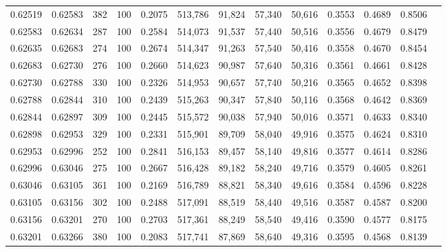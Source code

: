 \begin{tabular}{rrrrrrrrrrrrr}
0.62519 & 0.62583 &   382 & 100 &                                     0.2075 & 513,786 &  91,824 &  57,340 &  50,616 & 0.3553 & 0.4689 & 0.8506 \\
0.62583 & 0.62634 &   287 & 100 &                                     0.2584 & 514,073 &  91,537 &  57,440 &  50,516 & 0.3556 & 0.4679 & 0.8479 \\
0.62635 & 0.62683 &   274 & 100 &                                     0.2674 & 514,347 &  91,263 &  57,540 &  50,416 & 0.3558 & 0.4670 & 0.8454 \\
0.62683 & 0.62730 &   276 & 100 &                                     0.2660 & 514,623 &  90,987 &  57,640 &  50,316 & 0.3561 & 0.4661 & 0.8428 \\
0.62730 & 0.62788 &   330 & 100 &                                     0.2326 & 514,953 &  90,657 &  57,740 &  50,216 & 0.3565 & 0.4652 & 0.8398 \\
0.62788 & 0.62844 &   310 & 100 &                                     0.2439 & 515,263 &  90,347 &  57,840 &  50,116 & 0.3568 & 0.4642 & 0.8369 \\
0.62844 & 0.62897 &   309 & 100 &                                     0.2445 & 515,572 &  90,038 &  57,940 &  50,016 & 0.3571 & 0.4633 & 0.8340 \\
0.62898 & 0.62953 &   329 & 100 &                                     0.2331 & 515,901 &  89,709 &  58,040 &  49,916 & 0.3575 & 0.4624 & 0.8310 \\
0.62953 & 0.62996 &   252 & 100 &                                     0.2841 & 516,153 &  89,457 &  58,140 &  49,816 & 0.3577 & 0.4614 & 0.8286 \\
0.62996 & 0.63046 &   275 & 100 &                                     0.2667 & 516,428 &  89,182 &  58,240 &  49,716 & 0.3579 & 0.4605 & 0.8261 \\
0.63046 & 0.63105 &   361 & 100 &                                     0.2169 & 516,789 &  88,821 &  58,340 &  49,616 & 0.3584 & 0.4596 & 0.8228 \\
0.63105 & 0.63156 &   302 & 100 &                                     0.2488 & 517,091 &  88,519 &  58,440 &  49,516 & 0.3587 & 0.4587 & 0.8200 \\
0.63156 & 0.63201 &   270 & 100 &                                     0.2703 & 517,361 &  88,249 &  58,540 &  49,416 & 0.3590 & 0.4577 & 0.8175 \\
0.63201 & 0.63266 &   380 & 100 &                                     0.2083 & 517,741 &  87,869 &  58,640 &  49,316 & 0.3595 & 0.4568 & 0.8139 \\

\end{tabular}
